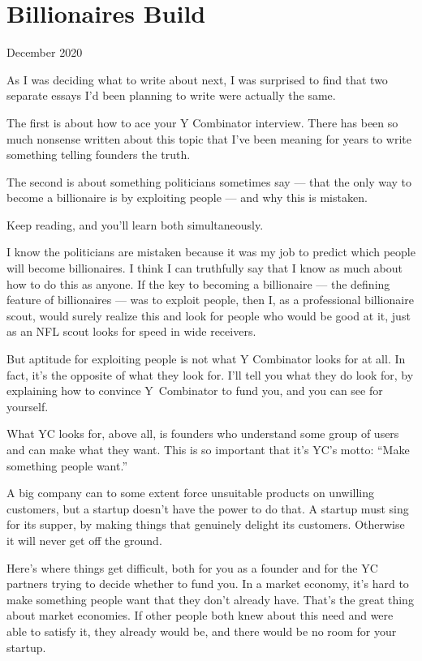 \chapter{Billionaires Build}

December 2020

As I was deciding what to write about next, I was surprised to find that
two separate essays I'd been planning to write were actually the same.

The first is about how to ace your Y Combinator interview. There has
been so much nonsense written about this topic that I've been meaning
for years to write something telling founders the truth.

The second is about something politicians sometimes say --- that the
only way to become a billionaire is by exploiting people --- and why
this is mistaken.

Keep reading, and you'll learn both simultaneously.

I know the politicians are mistaken because it was my job to predict
which people will become billionaires. I think I can truthfully say that
I know as much about how to do this as anyone. If the key to becoming a
billionaire --- the defining feature of billionaires --- was to exploit
people, then I, as a professional billionaire scout, would surely
realize this and look for people who would be good at it, just as an NFL
scout looks for speed in wide receivers.

But aptitude for exploiting people is not what Y Combinator looks for at
all. In fact, it's the opposite of what they look for. I'll tell you
what they do look for, by explaining how to convince Y~Combinator to
fund you, and you can see for yourself.

What YC looks for, above all, is founders who understand some group of
users and can make what they want. This is so important that it's YC's
motto: ``Make something people want.''

A big company can to some extent force unsuitable products on unwilling
customers, but a startup doesn't have the power to do that. A startup
must sing for its supper, by making things that genuinely delight its
customers. Otherwise it will never get off the ground.

Here's where things get difficult, both for you as a founder and for the
YC partners trying to decide whether to fund you. In a market economy,
it's hard to make something people want that they don't already have.
That's the great thing about market economies. If other people both knew
about this need and were able to satisfy it, they already would be, and
there would be no room for your startup.

